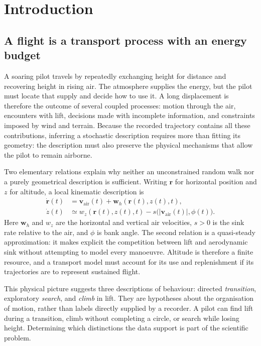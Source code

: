 \chapter{Introduction}
\label{ch:introduction}

\section{A flight is a transport process with an energy budget}

A soaring pilot travels by repeatedly exchanging height for distance and recovering height
in rising air. The atmosphere supplies the energy, but the pilot must locate that supply
and decide how to use it. A long displacement is therefore the outcome of several coupled
processes: motion through the air, encounters with lift, decisions made with incomplete
information, and constraints imposed by wind and terrain. Because the recorded trajectory
contains all these contributions, inferring a stochastic description requires more than
fitting its geometry: the description must also preserve the physical mechanisms that
allow the pilot to remain airborne.

Two elementary relations explain why neither an unconstrained random walk nor a purely
geometrical description is sufficient. Writing $\mathbf r$ for horizontal position and $z$
for altitude, a local kinematic description is
\begin{align}
  \dot{\mathbf r}(t)
    &=\mathbf v_{\mathrm{air}}(t)+\mathbf w_h(\mathbf r(t),z(t),t),
    \label{eq:intro-groundspeed}\\
  \dot z(t)&\simeq w_z(\mathbf r(t),z(t),t)
                  -s\bigl(|\mathbf v_{\mathrm{air}}(t)|,\phi(t)\bigr).
    \label{eq:intro-height}
\end{align}
Here $\mathbf w_h$ and $w_z$ are the horizontal and vertical air velocities, $s>0$ is the
sink rate relative to the air, and $\phi$ is bank angle. The second relation is a
quasi-steady approximation: it makes explicit the competition between lift and aerodynamic
sink without attempting to model every manoeuvre. Altitude is therefore a finite resource,
and a transport model must account for its use and replenishment if its trajectories are
to represent sustained flight.

This physical picture suggests three descriptions of behaviour: directed
\emph{transition}, exploratory \emph{search}, and \emph{climb} in lift. They are hypotheses
about the organisation of motion, rather than labels directly supplied by a recorder.
A pilot can find lift during a transition, climb without completing a circle, or search
while losing height. Determining which distinctions the data support is part of the
scientific problem.

